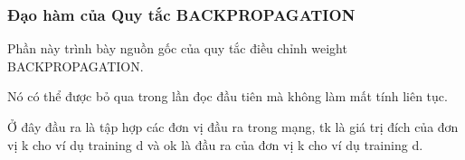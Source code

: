 \subsubsection{Đạo hàm của Quy tắc BACKPROPAGATION}

Phần này trình bày nguồn gốc của quy tắc điều chỉnh weight BACKPROPAGATION.

Nó có thể được bỏ qua trong lần đọc đầu tiên mà không làm mất tính liên tục.

Ở đây đầu ra là tập hợp các đơn vị đầu ra trong mạng, tk là giá trị đích của đơn vị k cho ví dụ training d và ok là đầu ra của đơn vị k cho ví dụ training d.

